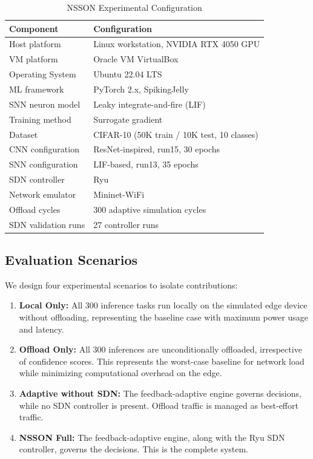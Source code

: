 \documentclass[journal]{IEEEtran}
\begin{document}
\begin{table}[H]
\caption{NSSON Experimental Configuration}
\label{tab:env}
\centering
\renewcommand{\arraystretch}{1.2}
\begin{tabular}{p{3.5cm}p{4.3cm}}
\toprule
\textbf{Component} & \textbf{Configuration} \\
\midrule
Host platform & Linux workstation, NVIDIA RTX 4050 GPU \\
VM platform & Oracle VM VirtualBox \\
Operating System & Ubuntu 22.04 LTS\\
ML framework & PyTorch 2.x, SpikingJelly \\
SNN neuron model & Leaky integrate-and-fire (LIF) \\
Training method & Surrogate gradient \\
Dataset & CIFAR-10 (50K train / 10K test, 10 classes) \\
CNN configuration & ResNet-inspired, run15, 30 epochs \\
SNN configuration & LIF-based, run13, 35 epochs \\
SDN controller & Ryu \\
Network emulator & Mininet-WiFi \\
Offload cycles & 300 adaptive simulation cycles \\
SDN validation runs & 27 controller runs \\
\bottomrule
\end{tabular}
\end{table}

\subsection{Evaluation Scenarios}
We design four experimental scenarios to isolate contributions:
\begin{enumerate}
\item \textbf{Local Only:} All 300 inference tasks run locally on the simulated edge device without offloading, representing the baseline case with maximum power usage and latency.
\item \textbf{Offload Only:} All 300 inferences are unconditionally offloaded, irrespective of confidence scores. This represents the worst-case baseline for network load while minimizing computational overhead on the edge.
\item \textbf{Adaptive without SDN:} The feedback-adaptive engine governs decisions, while no SDN controller is present. Offload traffic is managed as best-effort traffic.
\item \textbf{NSSON Full:} The feedback-adaptive engine, along with the Ryu SDN controller, governs the decisions.
  This is the complete system.
\end{enumerate}
\end{document}
